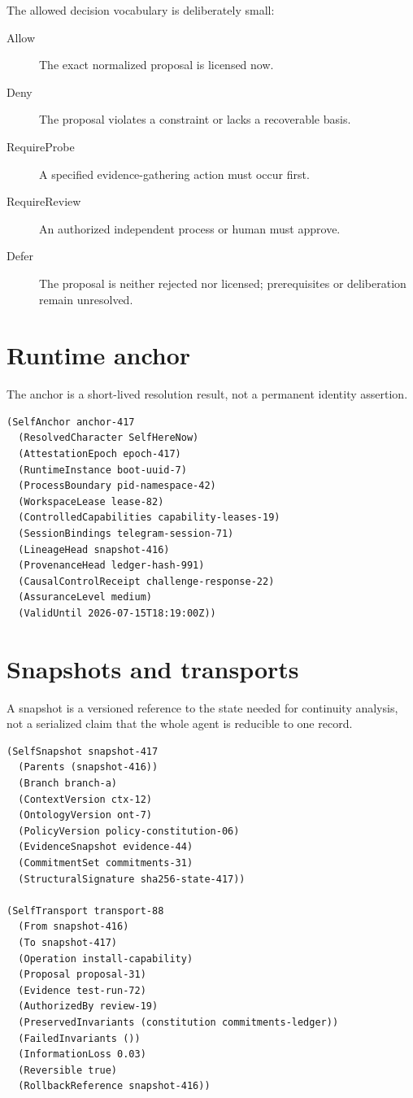 \documentclass[11pt,oneside]{report}
\begin{document}
The allowed decision vocabulary is deliberately small:

\begin{description}
  \item[Allow] The exact normalized proposal is licensed now.
  \item[Deny] The proposal violates a constraint or lacks a recoverable basis.
  \item[RequireProbe] A specified evidence-gathering action must occur first.
  \item[RequireReview] An authorized independent process or human must approve.
  \item[Defer] The proposal is neither rejected nor licensed; prerequisites or deliberation remain unresolved.
\end{description}

\section{Runtime anchor}

The anchor is a short-lived resolution result, not a permanent identity assertion.

\begin{lstlisting}[language=Metta,caption={Runtime-scoped SelfHereNow anchor}]
(SelfAnchor anchor-417
  (ResolvedCharacter SelfHereNow)
  (AttestationEpoch epoch-417)
  (RuntimeInstance boot-uuid-7)
  (ProcessBoundary pid-namespace-42)
  (WorkspaceLease lease-82)
  (ControlledCapabilities capability-leases-19)
  (SessionBindings telegram-session-71)
  (LineageHead snapshot-416)
  (ProvenanceHead ledger-hash-991)
  (CausalControlReceipt challenge-response-22)
  (AssuranceLevel medium)
  (ValidUntil 2026-07-15T18:19:00Z))
\end{lstlisting}

\section{Snapshots and transports}

A snapshot is a versioned reference to the state needed for continuity analysis, not a serialized claim that the whole agent is reducible to one record.

\begin{lstlisting}[language=Metta,caption={Directed self-transport}]
(SelfSnapshot snapshot-417
  (Parents (snapshot-416))
  (Branch branch-a)
  (ContextVersion ctx-12)
  (OntologyVersion ont-7)
  (PolicyVersion policy-constitution-06)
  (EvidenceSnapshot evidence-44)
  (CommitmentSet commitments-31)
  (StructuralSignature sha256-state-417))

(SelfTransport transport-88
  (From snapshot-416)
  (To snapshot-417)
  (Operation install-capability)
  (Proposal proposal-31)
  (Evidence test-run-72)
  (AuthorizedBy review-19)
  (PreservedInvariants (constitution commitments-ledger))
  (FailedInvariants ())
  (InformationLoss 0.03)
  (Reversible true)
  (RollbackReference snapshot-416))
\end{lstlisting}
\end{document}
